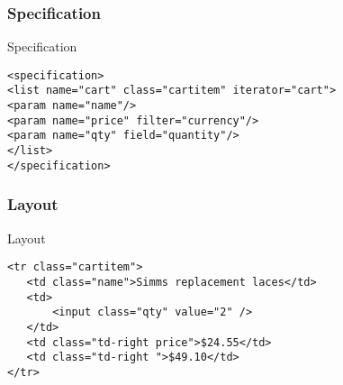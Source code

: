 \subsubsection{Specification}
\begin{frame}[fragile]{Specification}
\begin{lstlisting}
<specification>
<list name="cart" class="cartitem" iterator="cart">
<param name="name"/>
<param name="price" filter="currency"/>
<param name="qty" field="quantity"/>
</list>
</specification>
\end{lstlisting}
\end{frame}

\subsubsection{Layout}
\begin{frame}[fragile]{Layout}
\begin{lstlisting}
<tr class="cartitem">
   <td class="name">Simms replacement laces</td>
   <td>
       <input class="qty" value="2" />
   </td>
   <td class="td-right price">$24.55</td>
   <td class="td-right ">$49.10</td>
</tr>
\end{lstlisting}
\end{frame}




